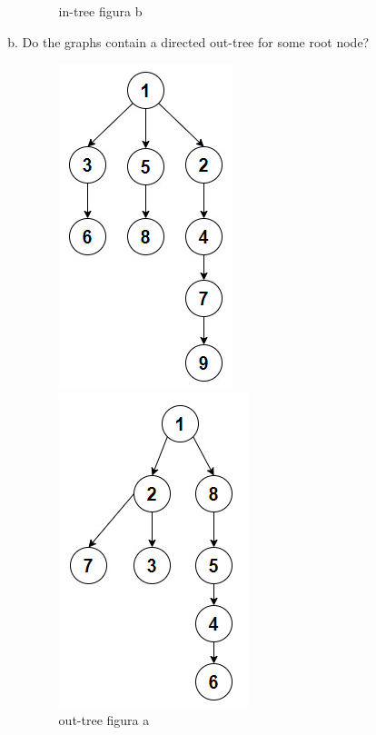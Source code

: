 \documentclass{report}
\begin{document}
\begin{enumerate}[2.1]
\begin{enumerate}[(a)]
\begin{figure}[ht]
\begin{minipage}[b]{0.4\linewidth}
            \caption{in-tree figura b}
            \end{minipage}
        \end{figure}
        \newpage
        \item Do the graphs contain a directed out-tree for some root node?
        \begin{figure}[ht]
                    \begin{minipage}[b]{0.4\linewidth}
                    \centering
                    \includegraphics[scale = 0.5]{2.4incisobfiguraa.jpeg}
                    \caption{out-tree figura a}
                    \end{minipage}
                    \hspace{0.5cm}
                    \begin{minipage}[b]{0.4\linewidth}
                    \centering
                    \includegraphics[scale = 0.5]{2.4incisobfigurab.jpeg}

\end{minipage}
\end{figure}
\end{enumerate}
\end{enumerate}
\end{document}
